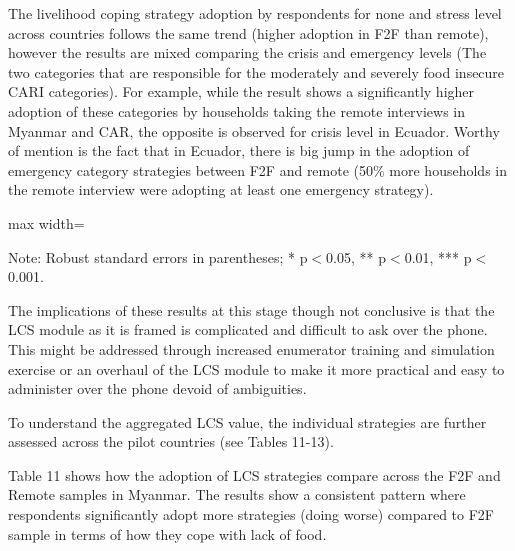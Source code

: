 \documentclass[11pt,harvard]{article}
\begin{document}
The livelihood coping strategy adoption by respondents for none and stress level across countries follows the same trend (higher adoption in F2F than remote), however the results are mixed comparing the crisis and emergency levels (The two categories that are responsible for the moderately and severely food insecure CARI categories). For example, while the result shows a significantly higher adoption of these categories by households taking the remote interviews in Myanmar and CAR, the opposite is observed for crisis level in Ecuador. Worthy of mention is the fact that in Ecuador, there is big jump in the adoption of emergency category strategies between F2F and remote (50\% more households in the remote interview were adopting at least one emergency strategy). 

\begin{table}[htbp]
	\centering
	\begin{adjustbox}{max width=\textwidth}
		\begin{threeparttable}
			\caption{Impact of Survey Modality on Livelihood Coping Strategy Index}
			\scriptsize
			 
			\label{tab:LCS_Modality_All_Country}
			\begin{tablenotes}
				\item Note: Robust standard errors in parentheses; * p$<$0.05, ** p$<$0.01, *** p$<$0.001. 
			\end{tablenotes}
		\end{threeparttable}
	\end{adjustbox}
\end{table}

The implications of these results at this stage though not conclusive is that the LCS module as it is framed is complicated and difficult to ask over the phone. This might be addressed through increased enumerator training and simulation exercise or an overhaul of the LCS module to make it more practical and easy to administer over the phone devoid of ambiguities.  

To understand the aggregated LCS value, the individual strategies are further assessed across the pilot countries (see Tables 11-13).

Table 11 shows how the adoption of LCS strategies compare across the F2F and Remote samples in Myanmar. The results show a consistent pattern where respondents significantly adopt more strategies (doing worse) compared to F2F sample in terms of how they cope with lack of food. 
\end{document}
